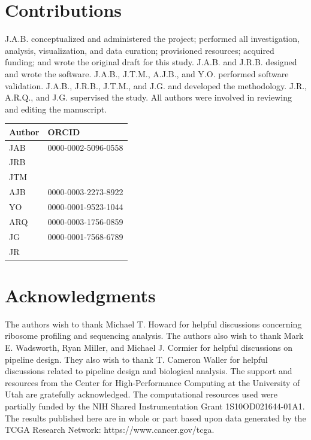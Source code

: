 \documentclass[10pt, oneside]{article}
\begin{document}
\section*{Contributions}
J.A.B. conceptualized and administered the project; performed all investigation, analysis, visualization, and data curation; provisioned resources; acquired funding; and wrote the original draft for this study. J.A.B. and J.R.B. designed and wrote the software. J.A.B., J.T.M., A.J.B., and Y.O. performed software validation. J.A.B., J.R.B., J.T.M., and J.G. and developed the methodology. J.R., A.R.Q., and J.G. supervised the study. All authors were involved in reviewing and editing the manuscript.

\begin{table}[!]
    \centering
{}
\begin{tabular}{p{2.4cm}p{7.5cm}}
 \textbf{Author} & \textbf{ORCID}\\
 \hline
 JAB & 0000-0002-5096-0558 \\
 \hline
 JRB & \\
 \hline
 JTM & \\
 \hline
 AJB & 0000-0003-2273-8922 \\
 \hline
 YO & 0000-0001-9523-1044 \\
 \hline
 ARQ & 0000-0003-1756-0859 \\
 \hline
 JG & 0000-0001-7568-6789 \\
 \hline
 JR & \\
\end{tabular}
\end{table}

\section*{Acknowledgments}
The authors wish to thank Michael T. Howard for helpful discussions concerning ribosome profiling and sequencing analysis. The authors also wish to thank Mark E. Wadsworth, Ryan Miller, and Michael J. Cormier for helpful discussions on pipeline design. They also wish to thank T. Cameron Waller for helpful discussions related to pipeline design and biological analysis. The support and resources from the Center for High-Performance Computing at the University of Utah are gratefully acknowledged. The computational resources used were partially funded by the NIH Shared Instrumentation Grant 1S10OD021644-01A1. The results published here are in whole or part based upon data generated by the TCGA Research Network: https://www.cancer.gov/tcga.
\end{document}
